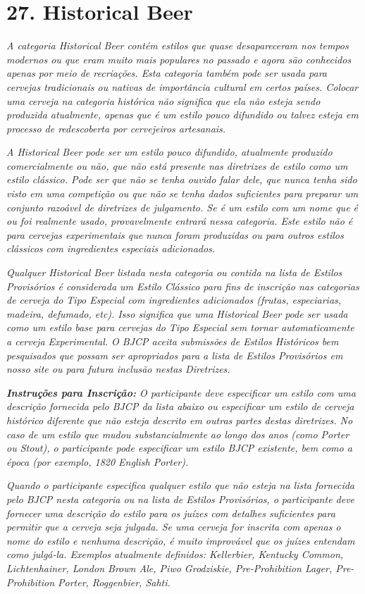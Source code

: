 \section*{27. Historical Beer}
\textit{A categoria Historical Beer contém estilos que quase desapareceram nos tempos modernos ou que eram muito mais populares no passado e agora são conhecidos apenas por meio de recriações. Esta categoria também pode ser usada para cervejas tradicionais ou nativas de importância cultural em certos países. Colocar uma cerveja na categoria histórica não significa que ela não esteja sendo produzida atualmente, apenas que é um estilo pouco difundido ou talvez esteja em processo de redescoberta por cervejeiros artesanais.}

\textit{A Historical Beer pode ser um estilo pouco difundido, atualmente produzido comercialmente ou não, que não está presente nas diretrizes de estilo como um estilo clássico. Pode ser que não se tenha ouvido falar dele, que nunca tenha sido visto em uma competição ou que não se tenha dados suficientes para preparar um conjunto razoável de diretrizes de julgamento. Se é um estilo com um nome que é ou foi realmente usado, provavelmente entrará nessa categoria. Este estilo não é para cervejas experimentais que nunca foram produzidas ou para outros estilos clássicos com ingredientes especiais adicionados.}

\textit{Qualquer Historical Beer listada nesta categoria ou contida na lista de Estilos Provisórios é considerada um Estilo Clássico para fins de inscrição nas categorias de cerveja do Tipo Especial com ingredientes adicionados (frutas, especiarias, madeira, defumado, etc). Isso significa que uma Historical Beer pode ser usada como um estilo base para cervejas do Tipo Especial sem tornar automaticamente a cerveja Experimental. O BJCP aceita submissões de Estilos Históricos bem pesquisados que possam ser apropriados para a lista de Estilos Provisórios em nosso site ou para futura inclusão nestas Diretrizes.}

\textit{\textbf{Instruções para Inscrição:} O participante deve especificar um estilo com uma descrição fornecida pelo BJCP da lista abaixo ou especificar um estilo de cerveja histórico diferente que não esteja descrito em outras partes destas diretrizes. No caso de um estilo que mudou substancialmente ao longo dos anos (como Porter ou Stout), o participante pode especificar um estilo BJCP existente, bem como a época (por exemplo, 1820 English Porter).}

\textit{Quando o participante especifica qualquer estilo que não esteja na lista fornecida pelo BJCP nesta categoria ou na lista de Estilos Provisórios, o participante deve fornecer uma descrição do estilo para os juízes com detalhes suficientes para permitir que a cerveja seja julgada. Se uma cerveja for inscrita com apenas o nome do estilo e nenhuma descrição, é muito improvável que os juízes entendam como julgá-la. Exemplos atualmente definidos: Kellerbier, Kentucky Common, Lichtenhainer, London Brown Ale, Piwo Grodziskie, Pre-Prohibition Lager, Pre-Prohibition Porter, Roggenbier, Sahti.}
